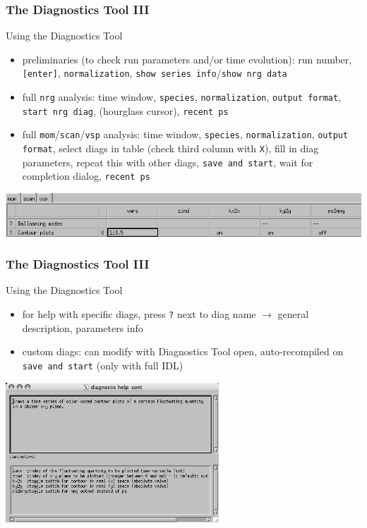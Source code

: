 \documentclass[10pt]{beamer}
\begin{document}
\begin{frame}[fragile]
  \frametitle{The Diagnostics Tool III}

\begin{block}{Using the Diagnostics Tool}

\begin{itemize}
\item preliminaries (to check run parameters and/or time evolution): run number,
\verb|[enter]|, \verb|normalization|, \verb|show series info|/\verb|show nrg data|
\item full \verb|nrg| analysis: time window, \verb|species|, \verb|normalization|,
\verb|output format|, \verb|start nrg diag|, (hourglass cursor), \verb|recent ps|
\item full \verb|mom|/\verb|scan|/\verb|vsp| analysis: time window, \verb|species|,
\verb|normalization|, \verb|output format|, select diags in table
(check third column with \verb|X|), fill in diag parameters, repeat this with other diags,
\verb|save and start|, wait for completion dialog, \verb|recent ps|
\end{itemize}

\includegraphics[width=14cm]{figs/diag_table_cont.png}

\end{block}

\end{frame}


\begin{frame}[fragile]
  \frametitle{The Diagnostics Tool III}

\begin{block}{Using the Diagnostics Tool}

\begin{itemize}
\item for help with specific diags, press \verb|?| next to diag name $\rightarrow$
general description, parameters info
\item custom diags: can modify with Diagnostics Tool open, auto-recompiled on
\verb|save and start| (only with full IDL)
\end{itemize}

\includegraphics[width=8cm]{figs/diag_cont_help.png}

\end{block}

\end{frame}
\end{document}
